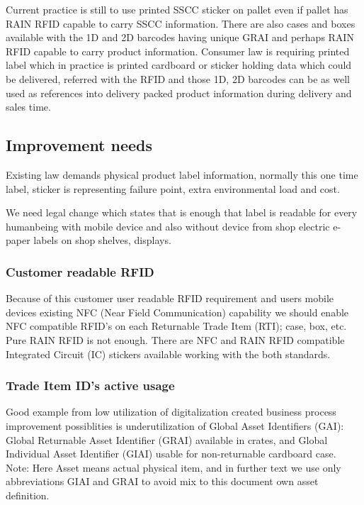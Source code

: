 Current practice is still to use printed SSCC sticker on pallet even if pallet
has RAIN RFID capable to carry SSCC information. There are also cases and
boxes available with the 1D and 2D barcodes having unique GRAI and perhaps
RAIN RFID capable to carry product information. Consumer law is requiring
printed label which in practice is printed cardboard or sticker holding data
which could be delivered, referred with the RFID and those 1D, 2D barcodes can
be as well used as references into delivery packed product information during
delivery and sales time.

\subsection{Improvement needs}\label{improvement_needs}

Existing law demands physical product label information, normally this one
time label, sticker is representing failure point, extra environmental load
and cost.

We need legal change which states that is enough that label is readable for
every humanbeing with mobile device and also without device from shop electric
e-paper labels on shop shelves, displays.

\subsubsection{Customer readable RFID}\label{improvement_NFC_RFID}
Because of this customer user readable RFID requirement and users mobile
devices existing NFC (Near Field Communication) capability we should enable
NFC compatible RFID's on each Returnable Trade Item (RTI); case, box, etc.
Pure RAIN RFID is not enough. There are NFC and RAIN RFID compatible
Integrated Circuit (IC)\allowbreak\cite{RAINFC} stickers
available\allowbreak\cite{RAINFC_label} working with the both standards.

\subsubsection{Trade Item ID's active usage}
\label{improvement_1D_2D_RFID_usage}
Good example from low utilization of digitalization created business process
improvement possiblities is underutilization of Global Asset Identifiers
(GAI): Global Returnable Asset Identifier (GRAI)\allowbreak\cite{
GRAI}\allowbreak\cite{IFCO}\allowbreak\cite{EUROPOOL} available in crates,
and Global Individual Asset Identifier (GIAI)\allowbreak\cite{
GIAI}\allowbreak\cite{CajoMakeBright} usable for non-returnable cardboard
case. Note: Here Asset means actual physical item,
and in further text we use only abbreviations GIAI and GRAI to avoid mix to
this document own asset definition.

